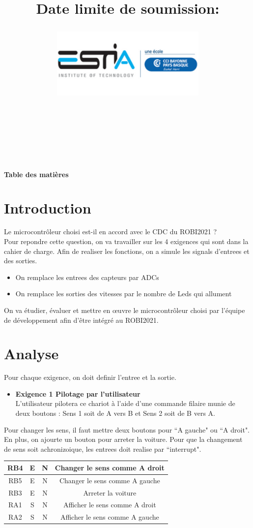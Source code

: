 \documentclass{article}
\title{
    \vspace{1in}
    \textmd{\textbf{\hmwkClass}}\\
    \textmd{\textbf{\hmwkTitle}}\\
    \normalsize\vspace{0.1in}\small{Date limite de soumission:\hmwkDueDate}\\
    \vspace{0.1in}\large{\textit{\hmwkClassTime}}    
    \vspace{1in}
    \begin{figure}[H]
    	\centering
    	\includegraphics[width=3in]{1.PNG}
    \end{figure}          
 \vspace{1.5in}
}
\author{\textbf{\hmwkAuthorName}\\
\textbf{\autre}\\
\textbf{\auttre}\\
}
\date{}
\begin{document}
\maketitle
\pagebreak	
\newpage
\begin{center}
\Huge\textbf{Table des matières}
\end{center}
\tableofcontents
\pagebreak



\section{Introduction}
Le microcontrôleur choisi est-il en accord avec le CDC du ROBI2021 ?\\
Pour repondre cette question, on va travailler sur les 4 exigences qui sont dans la cahier de charge. Afin de realiser les fonctions, on a simule les signals d'entrees et des sorties.\\

\begin{itemize}
\item On remplace les entrees des capteurs par ADCs
\item On remplace les sorties des vitesses par le nombre de Leds qui allument
\end{itemize}
On va étudier, évaluer et mettre en œuvre le microcontrôleur choisi par l’équipe de développement afin d’être intégré au ROBI2021.






\pagebreak
\section{Analyse}
Pour chaque exigence, on doit definir l'entree et la sortie.
\begin{itemize}
	\item \textbf{Exigence 1 Pilotage par l’utilisateur}\\
L’utilisateur pilotera ce chariot à l’aide d’une commande filaire munie de deux boutons : Sens 1 soit de A vers B et Sens 2 soit de B vers A.
\end{itemize}
Pour changer les sens, il faut mettre deux boutons pour ``A gauche" ou ``A droit". En plus, on ajourte un bouton pour arreter la voiture. Pour que la changement de sens soit achronizoique, les entrees doit realise par ``interrupt".
\begin{table}[htbp]
\centering
\begin{tabular}[h]{|c|c|c|c|}
	\hline
	RB4&E&N&Changer le sens comme A droit\\
	\hline
	RB5&E&N&Changer le sens comme A gauche\\
	\hline
	RB3&E&N&Arreter la voiture\\
	\hline
	RA1&S&N&Afficher le sens comme A droit\\
	\hline
	RA2&S&N&Afficher le sens comme A gauche\\
	\hline
\end{tabular}
\end{table}
\end{document}
